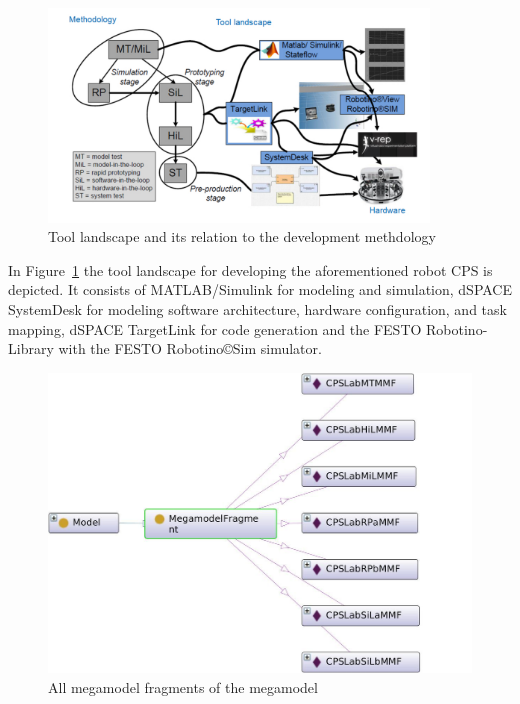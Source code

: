 \begin{figure}[!htb]
\centering
\includegraphics[width=0.9\textwidth]{figures/mm-hpi2.pdf}
\caption{Tool landscape and its relation to the development methdology}
\label{fig:MMFig2}
\end{figure}

In Figure~\ref{fig:MMFig2} the tool landscape for developing the aforementioned robot CPS is depicted. It consists of
%
MATLAB/Simulink for modeling and simulation,
%
dSPACE SystemDesk for modeling software architecture, hardware configuration, and task mapping,
%
dSPACE TargetLink for code generation and
%
the FESTO Robotino-Library with the FESTO Robotino{\copyright}Sim simulator.

\begin{figure}[!htb]
\centering
\includegraphics[scale=0.33]{figures/CPSLabMTMMF-NEW.jpeg}
\caption{All megamodel fragments of the \CPSLabMM megamodel}
\label{fig:MegaModelFragmentsForCPSLabMM}
\end{figure}
 
